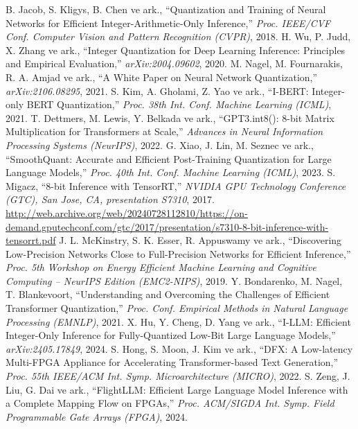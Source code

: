  B. Jacob, S. Kligys, B. Chen ve ark., ``Quantization and Training of Neural Networks for Efficient Integer-Arithmetic-Only Inference,'' \emph{Proc. IEEE/CVF Conf. Computer Vision and Pattern Recognition (CVPR)}, 2018.
 H. Wu, P. Judd, X. Zhang ve ark., ``Integer Quantization for Deep Learning Inference: Principles and Empirical Evaluation,'' \emph{arXiv:2004.09602}, 2020.
 M. Nagel, M. Fournarakis, R. A. Amjad ve ark., ``A White Paper on Neural Network Quantization,'' \emph{arXiv:2106.08295}, 2021.
 S. Kim, A. Gholami, Z. Yao ve ark., ``I-BERT: Integer-only BERT Quantization,'' \emph{Proc. 38th Int. Conf. Machine Learning (ICML)}, 2021.
 T. Dettmers, M. Lewis, Y. Belkada ve ark., ``GPT3.int8(): 8-bit Matrix Multiplication for Transformers at Scale,'' \emph{Advances in Neural Information Processing Systems (NeurIPS)}, 2022.
 G. Xiao, J. Lin, M. Seznec ve ark., ``SmoothQuant: Accurate and Efficient Post-Training Quantization for Large Language Models,'' \emph{Proc. 40th Int. Conf. Machine Learning (ICML)}, 2023.
 S. Migacz, ``8-bit Inference with TensorRT,'' \emph{NVIDIA GPU Technology Conference (GTC), San Jose, CA, presentation S7310}, 2017. \url{http://web.archive.org/web/20240728112810/https://on-demand.gputechconf.com/gtc/2017/presentation/s7310-8-bit-inference-with-tensorrt.pdf}
 J. L. McKinstry, S. K. Esser, R. Appuswamy ve ark., ``Discovering Low-Precision Networks Close to Full-Precision Networks for Efficient Inference,'' \emph{Proc. 5th Workshop on Energy Efficient Machine Learning and Cognitive Computing -- NeurIPS Edition (EMC2-NIPS)}, 2019.
 Y. Bondarenko, M. Nagel, T. Blankevoort, ``Understanding and Overcoming the Challenges of Efficient Transformer Quantization,'' \emph{Proc. Conf. Empirical Methods in Natural Language Processing (EMNLP)}, 2021.
 X. Hu, Y. Cheng, D. Yang ve ark., ``I-LLM: Efficient Integer-Only Inference for Fully-Quantized Low-Bit Large Language Models,'' \emph{arXiv:2405.17849}, 2024.
 S. Hong, S. Moon, J. Kim ve ark., ``DFX: A Low-latency Multi-FPGA Appliance for Accelerating Transformer-based Text Generation,'' \emph{Proc. 55th IEEE/ACM Int. Symp. Microarchitecture (MICRO)}, 2022.
 S. Zeng, J. Liu, G. Dai ve ark., ``FlightLLM: Efficient Large Language Model Inference with a Complete Mapping Flow on FPGAs,'' \emph{Proc. ACM/SIGDA Int. Symp. Field Programmable Gate Arrays (FPGA)}, 2024.
